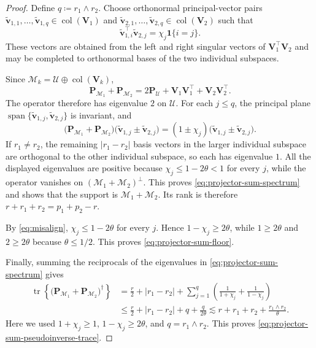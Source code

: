 \documentclass[11pt]{article}
\newcommand{\ind}{\bm{1}}
\newcommand{\trans}{\top}
\DeclareMathOperator{\col}{col}
\DeclareMathOperator{\tr}{tr}
\newcommand{\cU}{\mathcal{U}}
\newcommand{\cM}{\mathcal{M}}
\begin{document}
\begin{proof}
Define $q \coloneqq r_1 \wedge r_2$.  Choose
orthonormal principal-vector pairs
$\widetilde{\bm v}_{1,1},\ldots,\widetilde{\bm v}_{1,q}
\in\col(\bm V_1)$ and
$\widetilde{\bm v}_{2,1},\ldots,\widetilde{\bm v}_{2,q}
\in\col(\bm V_2)$ such that
\[
  \widetilde{\bm v}_{1,i}^\trans
  \widetilde{\bm v}_{2,j}
  =
  \chi_j\ind\{i=j\}.
\]
These vectors are obtained from the left and right singular vectors of
$\bm V_1^\trans\bm V_2$ and may be completed to orthonormal bases of the two
individual subspaces.

Since
$\cM_k=\cU\oplus\col(\bm V_k)$,
\[
  \bm P_{\cM_1}+\bm P_{\cM_2}
  =
  2\bm P_{\cU}
  +
  \bm V_1\bm V_1^\trans
  +
  \bm V_2\bm V_2^\trans.
\]
The operator therefore has eigenvalue $2$ on $\cU$.  For each $j\le q$, the
principal plane
$\operatorname{span}\{
\widetilde{\bm v}_{1,j},
\widetilde{\bm v}_{2,j}
\}$
is invariant, and
\[
  \bigl(
    \bm P_{\cM_1}+\bm P_{\cM_2}
  \bigr)
  \bigl(
    \widetilde{\bm v}_{1,j}
    \pm
    \widetilde{\bm v}_{2,j}
  \bigr)
  =
  (1\pm\chi_j)
  \bigl(
    \widetilde{\bm v}_{1,j}
    \pm
    \widetilde{\bm v}_{2,j}
  \bigr).
\]
If $r_1\ne r_2$, the remaining $|r_1-r_2|$ basis vectors in the larger
individual subspace are orthogonal to the other individual subspace, so each
has eigenvalue $1$.  All the displayed eigenvalues are positive because
$\chi_j\le1-2\theta<1$ for every $j$, while the operator vanishes on
$(\cM_1+\cM_2)^\perp$.  This proves \cref{eq:projector-sum-spectrum} and shows
that the support is $\cM_1+\cM_2$.  Its rank is therefore
$r+r_1+r_2=p_1+p_2-r$.

By \cref{eq:misalign},
$\chi_j\le1-2\theta$ for every $j$.  Hence
$1-\chi_j\ge2\theta$, while $1\ge2\theta$ and $2\ge2\theta$ because
$\theta\le1/2$.  This proves \cref{eq:projector-sum-floor}.

Finally, summing the reciprocals of the eigenvalues in
\cref{eq:projector-sum-spectrum} gives
\[
\begin{aligned}
  \tr\left\{
    \bigl(\bm P_{\cM_1}+\bm P_{\cM_2}\bigr)^\dagger
  \right\}
  &=
  \frac r2+|r_1-r_2|
  +\sum_{j=1}^{q}
  \left(
    \frac{1}{1+\chi_j}
    +
    \frac{1}{1-\chi_j}
  \right) \\
  &\le
  \frac r2+|r_1-r_2|+q+\frac{q}{2\theta}
  \lesssim
  r+r_1+r_2+\frac{r_1\wedge r_2}{\theta}.
\end{aligned}
\]
Here we used $1+\chi_j\ge1$, $1-\chi_j\ge2\theta$, and
$q=r_1\wedge r_2$. This proves
\cref{eq:projector-sum-pseudoinverse-trace}.
\end{proof}
\end{document}
